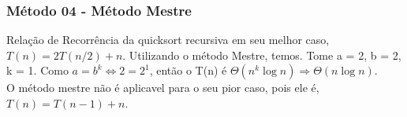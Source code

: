 \subsubsection{Método 04 - Método Mestre}
Relação de Recorrência da quicksort recursiva em seu melhor caso, $T(n) = 2T(n/2) + n$. Utilizando o método Mestre, temos.
Tome a = 2, b = 2, k = 1. Como $a = b^k \Leftrightarrow 2 = 2^1$, então o T(n) é $\Theta(n^k \log{n}) \Rightarrow \Theta(n \log{n})$. \\
O método mestre não é aplicavel para o seu pior caso, pois ele é, $T(n) = T(n-1) + n$.